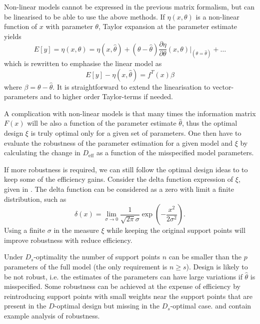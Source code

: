 \documentclass[12pt]{iopart}
\begin{document}
Non-linear models cannot be expressed in the previous matrix formalism, but can be linearised to be able to use the above methods. If $\eta(x, \theta)$ is a non-linear function of $x$ with parameter $\theta$, Taylor expansion at the parameter estimate yields
\begin{equation}
E[y] = \eta(x, \theta) = \eta(x, \hat \theta) + (\theta - \hat \theta) \frac{\partial \eta}{\partial \theta}(x, \theta)|_{(\theta = \hat \theta)} + \ldots
\end{equation}
which is rewritten to emphasise the linear model as
\begin{equation}
E[y] - \eta(x, \hat \theta) = f^T(x) \beta 
\end{equation}
where $\beta = \theta - \hat \theta$. It is straightforward to extend the linearisation to vector-parameters and to higher order Taylor-terms if needed.

A complication with non-linear models is that many times the information matrix $F(x)$ will be also a function of the parameter estimate $\hat \theta$, thus the optimal design $\xi$ is truly optimal only for a given set of parameters. One then have to evaluate the robustness of the parameter estimation for a given model and $\xi$ by calculating the change in $D_\mathrm{eff}$ as a function of the misspecified model parameters.

If more robustness is required, we can still follow the optimal design ideas to to keep some of the efficiency gains. Consider the delta function expression of $\xi$, given in . The delta function can be considered as a zero with limit a finite distribution, such as
\begin{equation}
\delta(x) = \lim_{\sigma \rightarrow 0} \frac{1}{\sqrt{2 \pi} \sigma } \exp\left(-\frac{x^2}{2 \sigma^2}\right).
\label{eq:deltafinite}
\end{equation}
Using a finite $\sigma$ in the measure $\xi$ while keeping the original support points will improve robustness with reduce efficiency. 

Under $D_s$-optimality the number of support points $n$ can be smaller than the $p$ parameters of the full model (the only requirement is $n \geq s$). Design is likely to be not robust, i.e. the estimates of the parameters can have large variations if $\hat \theta$ is misspecified. Some robustness can be achieved at the expense of efficiency by reintroducing support points with small weights near the support points that are present in the $D$-optimal design but missing in the $D_s$-optimal case.  and  contain example analysis of robustness.
\end{document}
